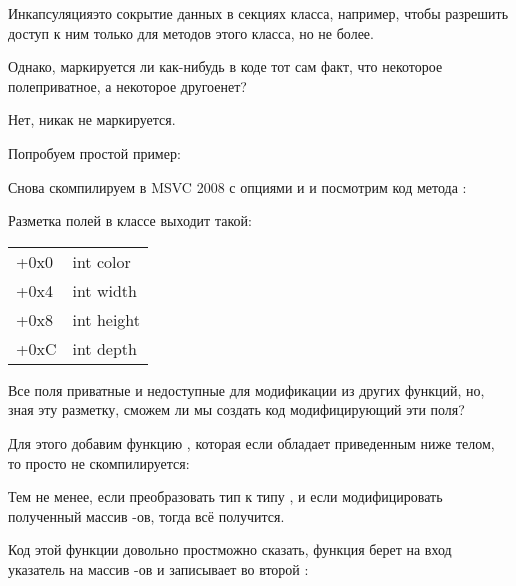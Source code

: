 
Инкапсуляция\EMDASH{}это сокрытие данных в  секциях класса, например, чтобы разрешить доступ к ним только 
для методов этого класса, но не более.

Однако, маркируется ли как-нибудь в коде тот сам факт, что некоторое поле\EMDASH{}приватное, 
а некоторое другое\EMDASH{}нет?

Нет, никак не маркируется.

Попробуем простой пример:



Снова скомпилируем в MSVC 2008 с опциями \Ox и \Obzero и посмотрим код метода :



Разметка полей в классе выходит такой:

\begin{center}
\begin{tabular}{ | l | l | }
\hline
  \tableheader{} \\
\hline
  +0x0 & int color \\
\hline
  +0x4 & int width \\
\hline
  +0x8 & int height \\
\hline
  +0xC & int depth \\
\hline
\end{tabular}
\end{center}

Все поля приватные и недоступные для модификации из других функций, но, зная эту разметку, 
сможем ли мы создать код модифицирующий эти поля? 

Для этого добавим функцию , которая если обладает 
приведенным ниже телом, то просто не скомпилируется:



Тем не менее, если преобразовать тип  к типу , 
и если модифицировать полученный массив \Tint{}-ов, тогда всё получится.



Код этой функции довольно прост\EMDASH{}можно сказать, функция берет на вход указатель на массив \Tint{}-ов и 
записывает  во второй \Tint{}:



